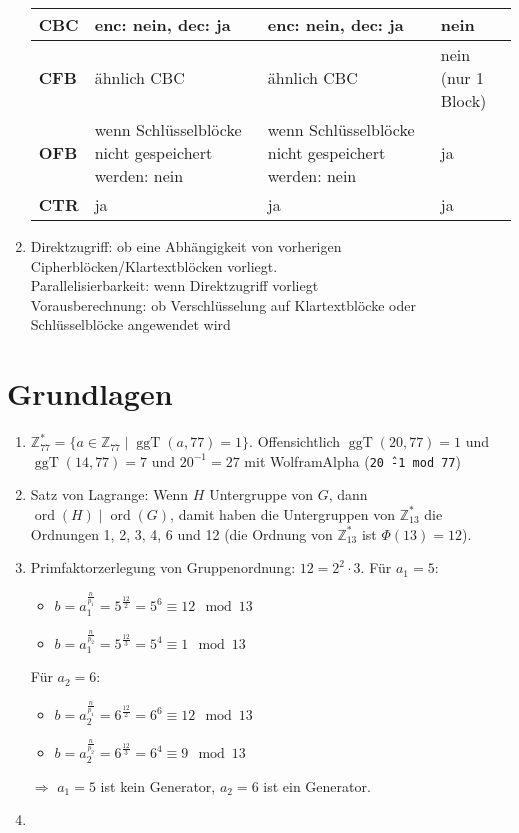 \documentclass{article}
\DeclareMathOperator{\ggT}{ggT}
\DeclareMathOperator{\ord}{ord}
\begin{document}
\begin{enumerate}[label=(\alph*)]
\begin{center}
\begin{tabular}{L{2cm}|L{4cm}|L{4cm}|L{4cm}}
				\hline
				\textbf{CBC} & enc: nein, dec: ja & enc: nein, dec: ja & nein \\
				\hline
				\textbf{CFB} & ähnlich CBC & ähnlich CBC & nein (nur 1 Block) \\
				\hline
				\textbf{OFB} & wenn Schlüsselblöcke nicht gespeichert werden: nein & wenn Schlüsselblöcke nicht gespeichert werden: nein & ja \\
				\hline
				\textbf{CTR} & ja & ja & ja \\
			\end{tabular}
		\end{center}
		\item Direktzugriff: ob eine Abhängigkeit von vorherigen Cipherblöcken/Klartextblöcken vorliegt. \\
		Parallelisierbarkeit: wenn Direktzugriff vorliegt \\
		Vorausberechnung: ob Verschlüsselung auf Klartextblöcke oder Schlüsselblöcke angewendet wird
	\end{enumerate}

	\section*{Grundlagen}
	\begin{enumerate}[label=(\alph*)]
		\item $\mathbb{Z}_{77}^\ast = \{a\in\mathbb{Z}_{77}\mid \ggT(a,77) = 1\}$. Offensichtlich $\ggT(20,77) = 1$ und $\ggT(14,77) = 7$ und $20^{-1} = 27$ mit WolframAlpha (\texttt{20\^\,-1 mod 77})
		\item Satz von Lagrange: Wenn $H$ Untergruppe von $G$, dann $\ord(H)\mid \ord(G)$, damit haben die Untergruppen von $\mathbb{Z}_{13}^\ast$ die Ordnungen 1, 2, 3, 4, 6 und 12 (die Ordnung von $\mathbb{Z}_{13}^\ast$ ist $\Phi(13) = 12$).
		\item Primfaktorzerlegung von Gruppenordnung: $12 = 2^2\cdot 3$. Für $a_1=5$:
		\begin{itemize}
			\item $b= a_1^{\frac{n}{p_1}} = 5^{\frac{12}{2}} = 5^6 \equiv 12 \mod 13$
			\item $b= a_1^{\frac{n}{p_2}} = 5^{\frac{12}{3}} = 5^4 \equiv 1 \mod 13$
		\end{itemize}
		Für $a_2 = 6$:
		\begin{itemize}
			\item $b= a_2^{\frac{n}{p_1}} = 6^{\frac{12}{2}} = 6^6 \equiv 12 \mod 13$
			\item $b= a_2^{\frac{n}{p_2}} = 6^{\frac{12}{3}} = 6^4 \equiv 9 \mod 13$
		\end{itemize}
		$\Rightarrow$ $a_1=5$ ist kein Generator, $a_2=6$ ist ein Generator.
		\item 
	\end{enumerate}
\end{document}
